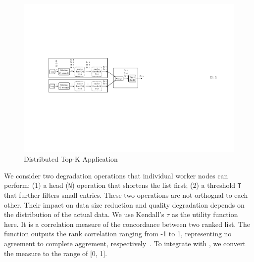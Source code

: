 \begin{figure}
  \centering
  \includegraphics[width=\columnwidth]{figures/topk.pdf}
  \caption{Distributed Top-K Application}
  \label{fig:topk}
\end{figure}

We consider two degradation operations that individual worker nodes can perform:
(1) a head (\texttt{N}) operation that shortens the list first; (2) a threshold
\texttt{T} that further filters small entries. These two operations are not
orthognal to each other. Their impact on data size reduction and quality
degradation depends on the distribution of the actual data. We use Kendall's
$\tau$ as the utility function here. It is a correlation measure of the
concordance between two ranked list. The function outputs the rank correlation
ranging from -1 to 1, representing no agreement to complete aggrement,
respectively~\cite{abdi2007kendall}. To integrate with \sysname{}, we convert
the measure to the range of [0, 1].

